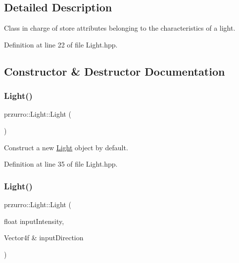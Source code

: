 \subsection{Detailed Description}
Class in charge of store attributes belonging to the characteristics of a light. 



Definition at line 22 of file Light.\+hpp.



\subsection{Constructor \& Destructor Documentation}
\mbox{\label{classprzurro_1_1_light_afaa4607772985f64464daffe7d96cf37}} 
\subsubsection{\texorpdfstring{Light()}{Light()}\hspace{0.1cm}{\footnotesize\ttfamily [1/2]}}
{\footnotesize\ttfamily przurro\+::\+Light\+::\+Light (\begin{DoxyParamCaption}{ }\end{DoxyParamCaption})\hspace{0.3cm}{\ttfamily [inline]}}



Construct a new \mbox{\hyperlink{classprzurro_1_1_light}{Light}} object by default. 



Definition at line 35 of file Light.\+hpp.

\mbox{\label{classprzurro_1_1_light_ad3a1fde2bf9a6cd0a58523e6592480e5}} 
\subsubsection{\texorpdfstring{Light()}{Light()}\hspace{0.1cm}{\footnotesize\ttfamily [2/2]}}
{\footnotesize\ttfamily przurro\+::\+Light\+::\+Light (\begin{DoxyParamCaption}\item[{float}]{input\+Intensity,  }\item[{Vector4f \&}]{input\+Direction }\end{DoxyParamCaption})\hspace{0.3cm}{\ttfamily [inline]}}



